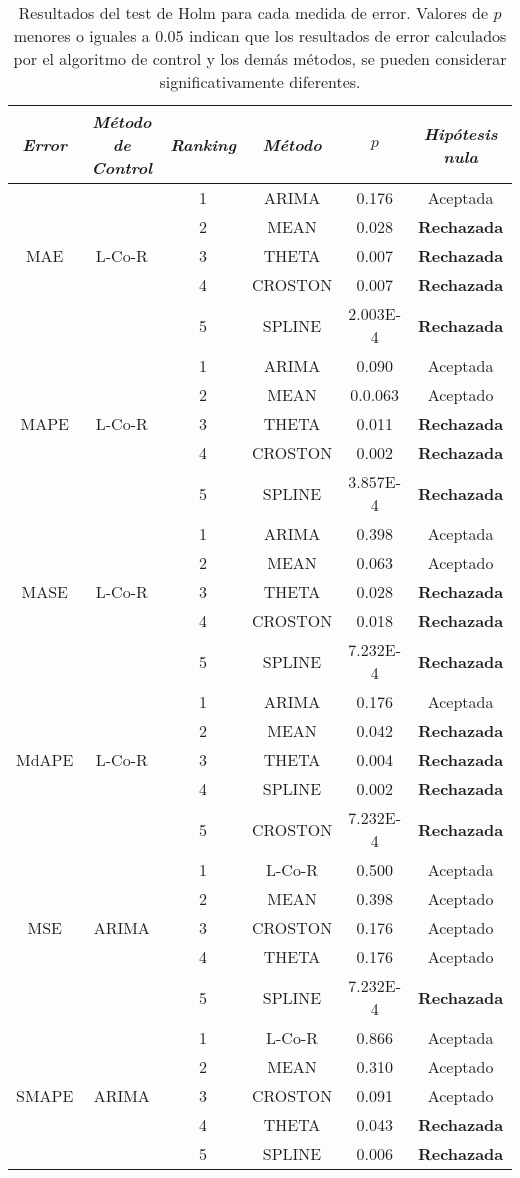 \documentclass[runningheads]{llncs}
\begin{document}
\begin{table}[!htp]\footnotesize
\begin{center}
\begin{tabular}{|cccccc|}
\hline
\emph{Error}&\emph{Método de Control}&\emph{Ranking}&
\emph{Método}&$p$& \emph{Hipótesis nula}\\
\hline
&&1&ARIMA&0.176&Aceptada\\
&&2&MEAN&0.028& \textbf{Rechazada}\\
MAE&L-Co-R&3&THETA&0.007& \textbf{Rechazada}\\
&&4&CROSTON&0.007& \textbf{Rechazada}\\
&&5&SPLINE&2.003E-4& \textbf{Rechazada}\\
\hline
&&1&ARIMA&0.090& Aceptada\\
&&2&MEAN&0.0.063& Aceptado \\
MAPE&L-Co-R&3&THETA&0.011& \textbf{Rechazada}\\
&&4&CROSTON&0.002& \textbf{Rechazada}\\
&&5&SPLINE&3.857E-4& \textbf{Rechazada}\\
\hline
&&1&ARIMA&0.398& Aceptada\\
&&2&MEAN&0.063& Aceptado \\
MASE&L-Co-R&3&THETA&0.028& \textbf{Rechazada}\\
&&4&CROSTON&0.018& \textbf{Rechazada}\\
&&5&SPLINE&7.232E-4& \textbf{Rechazada}\\
\hline
&&1&ARIMA&0.176&Aceptada\\
&&2&MEAN&0.042& \textbf{Rechazada}\\
MdAPE&L-Co-R&3&THETA&0.004& \textbf{Rechazada}\\
&&4&SPLINE&0.002& \textbf{Rechazada}\\
&&5&CROSTON&7.232E-4& \textbf{Rechazada}\\
\hline
&&1&L-Co-R&0.500&Aceptada\\
&&2&MEAN&0.398& Aceptado \\
MSE&ARIMA&3&CROSTON&0.176& Aceptado \\
&&4&THETA&0.176& Aceptado \\
&&5&SPLINE&7.232E-4& \textbf{Rechazada}\\
\hline
&&1&L-Co-R&0.866& Aceptada\\
&&2&MEAN&0.310& Aceptado \\
SMAPE&ARIMA&3&CROSTON&0.091 & Aceptado \\
&&4&THETA&0.043& \textbf{Rechazada}\\
&&5&SPLINE&0.006& \textbf{Rechazada}\\
\hline
\end{tabular}
\end{center}
\caption{Resultados del test de Holm para cada medida de error. Valores de $p$ menores o
iguales a $0.05$ indican que los resultados de error calculados por el algoritmo de control y los
demás métodos, se pueden considerar significativamente diferentes.
\label{tb:holm-all}}

\end{table}
\end{document}
